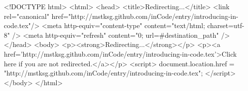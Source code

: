 <!DOCTYPE html>
<html>
<head>
<title>Redirecting...</title>
<link rel="canonical" href="http://mstksg.github.com/inCode/entry/introducing-in-code.tex"/>
<meta http-equiv="content-type" content="text/html; charset=utf-8" />
<meta http-equiv="refresh" content="0; url=#{destination_path}" />
</head>
<body>
  <p><strong>Redirecting...</strong></p>
  <p><a href='http://mstksg.github.com/inCode/entry/introducing-in-code.tex'>Click here if you are not redirected.</a></p>
  <script>
    document.location.href = "http://mstksg.github.com/inCode/entry/introducing-in-code.tex";
  </script>
</body>
</html>
